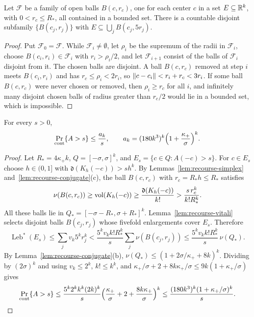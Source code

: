 \begin{lemma}
\label{lem:recourse-vitali}
Let $\mathcal F$ be a family of open balls $B(c,r_c)$, one for each
center $c$ in a set $E\subseteq\mathbb R^k$, with $0<r_c\le R_*$, all contained
in a bounded set. There is a countable disjoint subfamily
$\{B(c_j,r_j)\}$ with $E\subseteq\bigcup_jB(c_j,5r_j)$.
\end{lemma}

\begin{proof}
Put $\mathcal F_0=\mathcal F$. While $\mathcal F_i\ne\emptyset$, let
$\rho_i$ be the supremum of the radii in $\mathcal F_i$, choose
$B(c_i,r_i)\in\mathcal F_i$ with $r_i>\rho_i/2$, and let
$\mathcal F_{i+1}$ consist of the balls of $\mathcal F_i$ disjoint from
it. The chosen balls are disjoint. A ball $B(c,r_c)$ removed at step $i$
meets $B(c_i,r_i)$ and has $r_c\le\rho_i<2r_i$, so
$\left\lVert c-c_i\right\rVert<r_i+r_c<3r_i$. If some ball $B(c,r_c)$ were never chosen
or removed, then $\rho_i\ge r_c$ for all $i$, and infinitely many
disjoint chosen balls of radius greater than $r_c/2$ would lie in a
bounded set, which is impossible.
\end{proof}

\begin{lemma}
\label{lem:recourse-weak-tail}
For every $s>0$,
\[
 \Pr_{\rm cont}\{A>s\}\le\frac{a_k}s,\qquad
 a_k=(180k^3)^k\Bigl(1+\frac{\kappa_+}\sigma\Bigr)^k .
\]
\end{lemma}

\begin{proof}
Let $R_*=4\kappa_+k$, $Q=[-\sigma,\sigma]^k$, and
$E_s=\{c\in Q:A(-c)>s\}$. For $c\in E_s$ choose $h\in(0,1]$ with
$\mathfrak d(K_h(-c))>sh^k$. By Lemmas~\ref{lem:recourse-simplex}
and~\ref{lem:recourse-conjugate}(c), the ball $B(c,r_c)$ with
$r_c=R_*h\le R_*$ satisfies
\[
 \nu(B(c,r_c))\ge\operatorname{vol}(K_h(-c))\ge\frac{\mathfrak d(K_h(-c))}{k!}
 >\frac{s\,r_c^k}{k!R_*^k}.
\]
All these balls lie in $Q_*=[-\sigma-R_*,\sigma+R_*]^k$.
Lemma~\ref{lem:recourse-vitali} selects disjoint balls $B(c_j,r_j)$
whose fivefold enlargements cover $E_s$. Therefore
\[
 \operatorname{Leb}^*(E_s)\le\sum_jv_k5^kr_j^k
 <\frac{5^kv_kk!R_*^k}{s}\sum_j\nu(B(c_j,r_j))
 \le\frac{5^kv_kk!R_*^k}{s}\,\nu(Q_*).
\]
By Lemma~\ref{lem:recourse-conjugate}(b),
$\nu(Q_*)\le(1+2\sigma/\kappa_++8k)^k$. Dividing by $(2\sigma)^k$ and
using $v_k\le2^k$, $k!\le k^k$, and
$\kappa_+/\sigma+2+8k\kappa_+/\sigma\le9k(1+\kappa_+/\sigma)$ gives
\[
 \Pr_{\rm cont}\{A>s\}\le\frac{5^k2^kk^k(2k)^k}{s}
 \Bigl(\frac{\kappa_+}\sigma+2+\frac{8k\kappa_+}\sigma\Bigr)^k
 \le\frac{(180k^3)^k(1+\kappa_+/\sigma)^k}{s}.\qedhere
\]
\end{proof}

